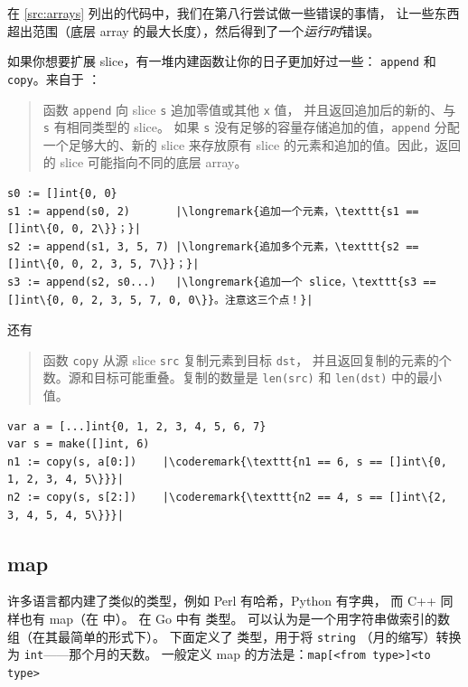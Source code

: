 在 \ref{src:arrays} 列出的代码中，我们在第八行尝试做一些错误的事情，
让一些东西超出范围（底层 array 的最大长度），然后得到了一个\emph{运行时}错误。

如果你想要扩展 slice，有一堆内建函数让你的日子更加好过一些：
\lstinline{append} 和 \lstinline{copy}。来自于 \cite{go_spec}：
\begin{quote}
函数 \lstinline{append} 向 slice \lstinline{s} 追加零值或其他 \lstinline{x} 值，
并且返回追加后的新的、与 \lstinline{s} 有相同类型的 slice。
如果 \lstinline{s} 没有足够的容量存储追加的值，\lstinline{append} 分配一个足够大的、新的 slice
来存放原有 slice 的元素和追加的值。因此，返回的 slice 可能指向不同的底层 array。
\end{quote}
\begin{lstlisting}
s0 := []int{0, 0}
s1 := append(s0, 2)       |\longremark{追加一个元素，\texttt{s1 == []int\{0, 0, 2\}}；}|
s2 := append(s1, 3, 5, 7) |\longremark{追加多个元素，\texttt{s2 == []int\{0, 0, 2, 3, 5, 7\}}；}|
s3 := append(s2, s0...)   |\longremark{追加一个 slice，\texttt{s3 == []int\{0, 0, 2, 3, 5, 7, 0, 0\}}。注意这三个点！}|
\end{lstlisting}
\showremarks
还有
\begin{quote}
函数 \lstinline{copy} 从源 slice \lstinline{src} 复制元素到目标 \lstinline{dst}，
并且返回复制的元素的个数。源和目标可能重叠。复制的数量是 \lstinline{len(src)} 和
\mbox{\lstinline{len(dst)}} 中的最小值。
\end{quote}
\begin{lstlisting}
var a = [...]int{0, 1, 2, 3, 4, 5, 6, 7}
var s = make([]int, 6)
n1 := copy(s, a[0:])    |\coderemark{\texttt{n1 == 6, s == []int\{0, 1, 2, 3, 4, 5\}}}|
n2 := copy(s, s[2:])    |\coderemark{\texttt{n2 == 4, s == []int\{2, 3, 4, 5, 4, 5\}}}|
\end{lstlisting}

\subsection{map}
\label{sec:maps}
许多语言都内建了类似的类型，例如 Perl 有哈希，Python 有字典，
而 C++ 同样也有 map（在 中）。 
在 Go 中有  类型。 
可以认为是一个用字符串做索引的数组（在其最简单的形式下）。
下面定义了  类型，用于将 \lstinline{string} （月的缩写）转换为 \lstinline{int}——那个月的天数。 
一般定义 map 的方法是：\verb|map[<from type>]<to type>|

